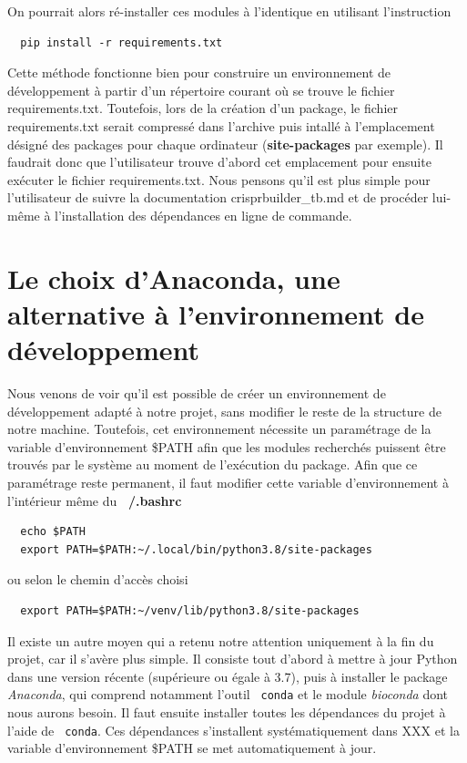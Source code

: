 \documentclass[twoside,a4paper,11pt,frenchb,openany]{report}
\begin{document}
On pourrait alors ré-installer ces modules à l'identique en utilisant l'instruction
\begin{verbatim}  pip install -r requirements.txt\end{verbatim}

Cette méthode fonctionne bien pour construire un environnement de développement à partir d'un répertoire courant où se trouve le fichier requirements.txt. Toutefois, lors de la création d'un package, le fichier requirements.txt serait compressé dans l'archive puis intallé à l'emplacement désigné des packages pour chaque ordinateur (\textbf{site-packages} par exemple). Il faudrait donc que l'utilisateur trouve d'abord cet emplacement pour ensuite exécuter le fichier requirements.txt. Nous pensons qu'il est plus simple pour l'utilisateur de suivre la documentation crisprbuilder\_tb.md et de procéder lui-même à l'installation des dépendances en ligne de commande.



\section{Le choix d'Anaconda, une alternative à l'environnement de développement}

Nous venons de voir qu'il est possible de créer un environnement de développement adapté à notre projet, sans modifier le reste de la structure de notre machine. Toutefois, cet environnement nécessite un paramétrage de la variable d'environnement \$PATH afin que les modules recherchés puissent être trouvés par le système au moment de l'exécution du package. Afin que ce paramétrage reste permanent, il faut modifier cette variable d'environnement à l'intérieur même du \textbf{~/.bashrc}

\begin{verbatim}
  echo $PATH
  export PATH=$PATH:~/.local/bin/python3.8/site-packages
\end{verbatim}

ou selon le chemin d'accès choisi

\begin{verbatim}
  export PATH=$PATH:~/venv/lib/python3.8/site-packages
\end{verbatim}

Il existe un autre moyen qui a retenu notre attention uniquement à la fin du projet, car il s'avère plus simple. Il consiste tout d'abord à mettre à jour Python dans une version récente (supérieure ou égale à 3.7), puis à installer le package \textit{Anaconda}, qui comprend notamment l'outil \texttt{  conda} et le module \textit{bioconda} dont nous aurons besoin. Il faut ensuite installer toutes les dépendances du projet à l'aide de \texttt{  conda}. Ces dépendances s'installent systématiquement dans XXX et la variable d'environnement \$PATH se met automatiquement à jour.
\end{document}
